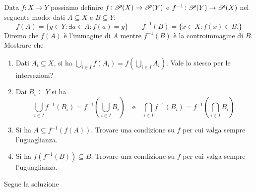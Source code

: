 \begin{es}
  Data $ f \colon X \to Y $ possiamo definire $ f \colon \P(X) \to \P(Y) $ e $ f^{-1} \colon \P(Y) \to \P(X) $ nel seguente modo: dati $ A \subseteq X $ e $ B \subseteq Y $:
  \[f(A) = \{y \in Y : \exists a \in A : f(a) = y\} \qquad f^{-1}(B) = \{x \in X : f(x) \in B.\}\]
  Diremo che $ f(A) $ è l'immagine di $ A $ mentre $ f^{-1}(B) $ è la controimmagine di $ B $. Mostrare che
  \begin{enumerate}
  \item Dati $ A_i \subseteq X $, si ha $ \bigcup_{i \in I} f(A_i) = f \left (\bigcup_{i \in I} A_i \right ) $. Vale lo stesso per le intersezioni?
  \item Dai $ B_i \subseteq Y $ si ha \[ \bigcup_{i \in I} f^{-1}(B_i) = f^{-1} \left (\bigcup_{i \in I} B_i \right ) \quad \text{e} \quad \bigcap_{i \in I} f^{-1}(B_i) = f^{-1} \left (\bigcap_{i \in I} B_i \right ).\]
  \item Si ha $ A \subseteq f^{-1}(f(A)) $. Trovare una condizione su $ f $ per cui valga sempre l'uguaglianza.
  \item Si ha $ f(f^{-1}(B)) \subseteq B $. Trovare una condizione su $ f $ per cui valga sempre l'uguaglianza.
  \end{enumerate}
\end{es}
%
Segue la soluzione
